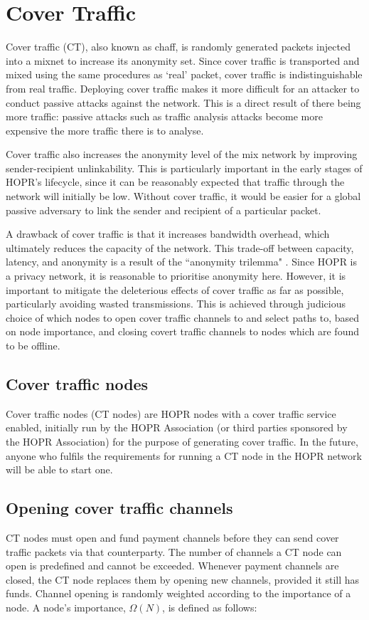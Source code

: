 \section{Cover Traffic}
\label{sec:CT}

Cover traffic (CT), also known as chaff, is randomly generated packets injected into a mixnet to increase its anonymity set. Since cover traffic is transported and mixed using the same procedures as `real' packet, cover traffic is indistinguishable from real traffic. Deploying cover traffic makes it more difficult for an attacker to conduct passive attacks against the network. This is a direct result of there being more traffic: passive attacks such as traffic analysis attacks become more expensive the more traffic there is to analyse.

Cover traffic also increases the anonymity level of the mix network by improving sender-recipient unlinkability. This is particularly important in the early stages of HOPR's lifecycle, since it can be reasonably expected that traffic through the network will initially be low. Without cover traffic, it would be easier for a global passive adversary to link the sender and recipient of a particular packet.

A drawback of cover traffic is that it increases bandwidth overhead, which ultimately reduces the capacity of the network. This trade-off between capacity, latency, and anonymity is a result of the ``anonymity trilemma" \cite{AnonymityTrilemma}. Since HOPR is a privacy network, it is reasonable to prioritise anonymity here. However, it is important to mitigate the deleterious effects of cover traffic as far as possible, particularly avoiding wasted transmissions. This is achieved through judicious choice of which nodes to open cover traffic channels to and select paths to, based on node importance, and closing covert traffic channels to nodes which are found to be offline. 

\subsection{Cover traffic nodes}
Cover traffic nodes (CT nodes) are HOPR nodes with a cover traffic service enabled, initially run by the HOPR Association (or third parties sponsored by the HOPR Association) for the purpose of generating cover traffic. In the future, anyone who fulfils the requirements for running a CT node in the HOPR network will be able to start one.

\subsection{Opening cover traffic channels} 
CT nodes must open and fund payment channels before they can send cover traffic packets via that counterparty. The number of channels a CT node can open is predefined and cannot be exceeded. Whenever payment channels are closed, the CT node replaces them by opening new channels, provided it still has funds. Channel opening is randomly weighted according to the importance of a node. A node's importance, $\Omega(N)$, is defined as follows:


